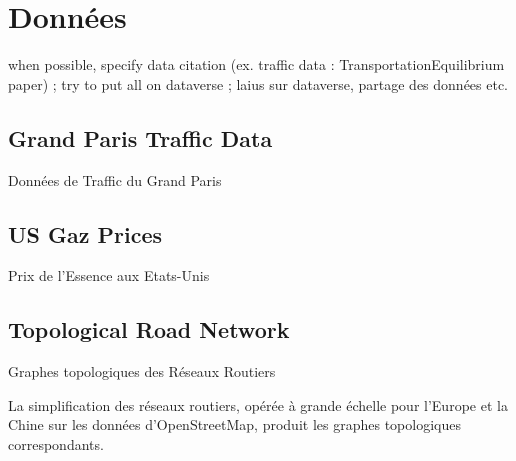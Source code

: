 \chapter{Données}



\label{app:data} %







when possible, specify data citation (ex. traffic data : TransportationEquilibrium paper) ; try to put all on dataverse ; laius sur dataverse, partage des données etc.




\section{Grand Paris Traffic Data}{Données de Traffic du Grand Paris}





\section{US Gaz Prices}{Prix de l'Essence aux Etats-Unis}






\section{Topological Road Network}{Graphes topologiques des Réseaux Routiers}

La simplification des réseaux routiers, opérée à grande échelle pour l'Europe et la Chine sur les données d'OpenStreetMap, produit les graphes topologiques correspondants. 





